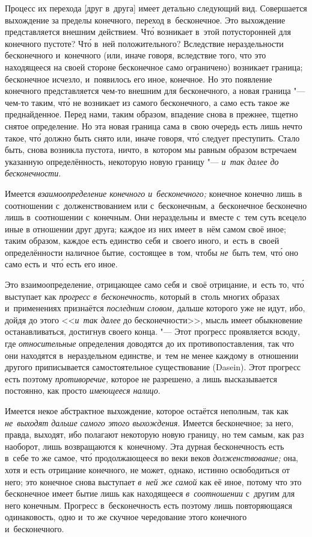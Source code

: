 Процесс их перехода [друг в~друга] имеет детально следующий вид. Совершается
выхождение за пределы конечного, переход в~бесконечное. Это выхождение
представляется внешним действием. Чт\'{о} возникает в~этой потусторонней для
конечного пустоте? Чт\'{о} в~ней положительного? Вследствие нераздельности
бесконечного и~конечного (или, иначе говоря, вследствие того, что это
находящееся на своей стороне бесконечное само ограничено) возникает
граница; бесконечное исчезло, и~появилось его иное, конечное. Но это
появление конечного представляется чем-то внешним для бесконечного, а
новая граница "--- чем-то таким, чт\'{о} не возникает из самого бесконечного, а
само есть такое же преднайденное. Перед нами, таким образом, впадение снова
в прежнее, тщетно снятое определение. Но эта новая граница сама в~свою
очередь есть лишь нечто такое, чт\'{о} должно быть снято или, иначе говоря, чт\'{о}
следует преступить. Стало быть, снова возникла пустота, ничто, в~котором мы
равным образом встречаем указанную определённость, некоторую новую границу
"--- {\em и~так далее до бесконечности}.

Имеется {\em взаимоопределение конечного и~бесконечного;} конечное конечно лишь
в соотношении с~долженствованием или с~бесконечным, а~бесконечное бесконечно
лишь в~соотношении с~конечным. Они нераздельны и~вместе с~тем суть всецело иные
в отношении друг друга; каждое из них имеет в~нём самом своё иное; таким
образом, каждое есть единство себя и~своего иного, и~есть в~своей
определённости наличное бытие, состоящее в~том, чтобы {\em не}~быть тем, чт\'{о}
оно само есть и~чт\'{о} есть его иное.

Это взаимоопределение, отрицающее само себя и~своё отрицание, и~есть то, чт\'{о}
выступает как {\em прогресс в~бесконечность,} который в~столь многих образах
и~применениях признаётся {\em последним словом,} дальше которого уже не идут,
ибо, дойдя до этого <<{\em и~так далее} до бесконечности>>, мысль имеет
обыкновение останавливаться, достигнув своего конца. "--- Этот прогресс
проявляется всюду, где {\em относительные} определения доводятся до их
противопоставления, так что они находятся в~нераздельном единстве, и~тем не
менее каждому в~отношении другого приписывается самостоятельное существование
(Dasein). Этот прогресс есть поэтому {\em противоречие,} которое не разрешено,
а лишь высказывается постоянно, как просто {\em имеющееся налицо}.

Имеется некое абстрактное выхождение, которое остаётся неполным, так как
{\em не~выходят дальше самого этого выхождения}. Имеется бесконечное; за него,
правда, выходят, ибо полагают некоторую новую границу, но тем самым, как раз
наоборот, лишь возвращаются к~конечному. Эта дурная бесконечность есть в~себе
то же самое, чт\'{о} продолжающееся во веки веков {\em долженствование;} она, хотя
и есть отрицание конечного, не может, однако, истинно освободиться от него; это
конечное снова выступает {\em в~ней же самой} как её иное, потому что это
бесконечное имеет бытие лишь как находящееся {\em в~соотношении} с~другим для
него конечным. Прогресс в~бесконечность есть поэтому лишь повторяющаяся
одинаковость, одно и~то же скучное чередование этого конечного и~бесконечного.


